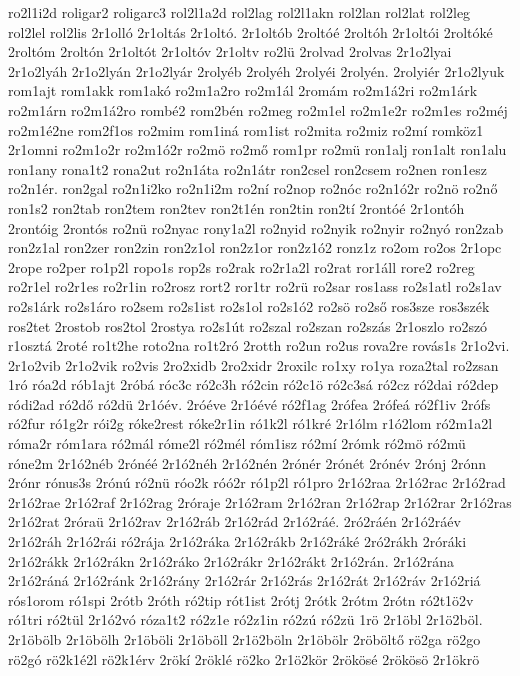 {ro2l1i2d
roligar2
roligarc3
rol2l1a2d
rol2lag
rol2l1akn
rol2lan
rol2lat
rol2leg
rol2lel
rol2lis
2r1olló
2r1oltás
2r1oltó.
2r1oltób
2roltóé
2roltóh
2r1oltói
2roltóké
2roltóm
2roltón
2r1oltót
2r1oltóv
2r1oltv
ro2lü
2rolvad
2rolvas
2r1o2lyai
2r1o2lyáh
2r1o2lyán
2r1o2lyár
2rolyéb
2rolyéh
2rolyéi
2rolyén.
2rolyiér
2r1o2lyuk
rom1ajt
rom1akk
rom1akó
ro2m1a2ro
ro2m1ál
2romám
ro2m1á2ri
ro2m1árk
ro2m1árn
ro2m1á2ro
rombé2
rom2bén
ro2meg
ro2m1el
ro2m1e2r
ro2m1es
ro2méj
ro2m1é2ne
rom2f1os
ro2mim
rom1iná
rom1ist
ro2mita
ro2miz
ro2mí
romköz1
2r1omni
ro2m1o2r
ro2m1ó2r
ro2mö
ro2mő
rom1pr
ro2mü
ron1alj
ron1alt
ron1alu
ron1any
rona1t2
rona2ut
ro2n1áta
ro2n1átr
ron2csel
ron2csem
ro2nen
ron1esz
ro2n1ér.
ron2gal
ro2n1i2ko
ro2n1i2m
ro2ní
ro2nop
ro2nóc
ro2n1ó2r
ro2nö
ro2nő
ron1s2
ron2tab
ron2tem
ron2tev
ron2t1én
ron2tin
ron2tí
2rontóé
2r1ontóh
2rontóig
2rontós
ro2nü
ro2nyac
rony1a2l
ro2nyid
ro2nyik
ro2nyir
ro2nyó
ron2zab
ron2z1al
ron2zer
ron2zin
ron2z1ol
ron2z1or
ron2z1ó2
ronz1z
ro2om
ro2os
2r1opc
2rope
ro2per
ro1p2l
ropo1s
rop2s
ro2rak
ro2r1a2l
ro2rat
ror1áll
rore2
ro2reg
ro2r1el
ro2r1es
ro2r1in
ro2rosz
rort2
ror1tr
ro2rü
ro2sar
ros1ass
ro2s1atl
ro2s1av
ro2s1árk
ro2s1áro
ro2sem
ro2s1ist
ro2s1ol
ro2s1ó2
ro2sö
ro2ső
ros3sze
ros3szék
ros2tet
2rostob
ros2tol
2rostya
ro2s1út
ro2szal
ro2szan
ro2szás
2r1oszlo
ro2szó
r1osztá
2roté
ro1t2he
roto2na
ro1t2ró
2rotth
ro2un
ro2us
rova2re
rovás1s
2r1o2vi.
2r1o2vib
2r1o2vik
ro2vis
2ro2xidb
2ro2xidr
2roxilc
ro1xy
ro1ya
roza2tal
ro2zsan
1ró
róa2d
rób1ajt
2róbá
róc3c
ró2c3h
ró2cin
ró2c1ö
ró2c3sá
ró2cz
ró2dai
ró2dep
ródi2ad
ró2dő
ró2dü
2r1óév.
2róéve
2r1óévé
ró2f1ag
2rófea
2rófeá
ró2f1iv
2rófs
ró2fur
ró1g2r
rói2g
róke2rest
róke2r1in
ró1k2l
ró1kré
2r1ólm
r1ó2lom
ró2m1a2l
róma2r
róm1ara
ró2mál
róme2l
ró2mél
róm1isz
ró2mí
2rómk
ró2mö
ró2mü
róne2m
2r1ó2néb
2rónéé
2r1ó2néh
2r1ó2nén
2rónér
2rónét
2rónév
2rónj
2rónn
2rónr
rónus3s
2rónú
ró2nü
róo2k
róó2r
ró1p2l
ró1pro
2r1ó2raa
2r1ó2rac
2r1ó2rad
2r1ó2rae
2r1ó2raf
2r1ó2rag
2róraje
2r1ó2ram
2r1ó2ran
2r1ó2rap
2r1ó2rar
2r1ó2ras
2r1ó2rat
2róraü
2r1ó2rav
2r1ó2ráb
2r1ó2rád
2r1ó2ráé.
2ró2ráén
2r1ó2ráév
2r1ó2ráh
2r1ó2rái
ró2rája
2r1ó2ráka
2r1ó2rákb
2r1ó2ráké
2ró2rákh
2róráki
2r1ó2rákk
2r1ó2rákn
2r1ó2ráko
2r1ó2rákr
2r1ó2rákt
2r1ó2rán.
2r1ó2rána
2r1ó2ráná
2r1ó2ránk
2r1ó2rány
2r1ó2rár
2r1ó2rás
2r1ó2rát
2r1ó2ráv
2r1ó2riá
rós1orom
ró1spi
2rótb
2róth
ró2tip
rót1ist
2rótj
2rótk
2rótm
2rótn
ró2t1ö2v
ró1tri
ró2tül
2r1ó2vó
róza1t2
ró2z1e
ró2z1in
ró2zú
ró2zü
1rö
2r1öbl
2r1ö2böl.
2r1öbölb
2r1öbölh
2r1öböli
2r1öböll
2r1ö2böln
2r1öbölr
2röböltő
rö2ga
rö2go
rö2gó
rö2k1é2l
rö2k1érv
2rökí
2röklé
rö2ko
2r1ö2kör
2rökösé
2rökösö
2r1ökrö
}
